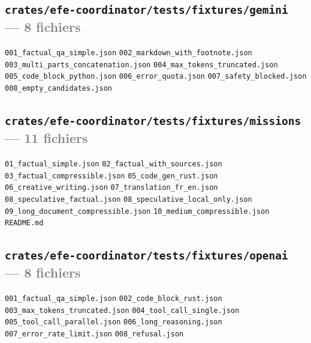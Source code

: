 \documentclass[10pt]{report}
\newcommand{\code}[1]{\texttt{\small #1}}
\begin{document}
\subsection*{\code{crates/efe-coordinator/tests/fixtures/gemini} \normalfont\textcolor{grey}{--- 8 fichiers}}
\begin{sloppypar}\footnotesize\raggedright
\code{001\_factual\_qa\_simple.json} \;\textbullet\; \code{002\_markdown\_with\_footnote.json} \;\textbullet\; \code{003\_multi\_parts\_concatenation.json} \;\textbullet\; \code{004\_max\_tokens\_truncated.json} \;\textbullet\; \code{005\_code\_block\_python.json} \;\textbullet\; \code{006\_error\_quota.json} \;\textbullet\; \code{007\_safety\_blocked.json} \;\textbullet\; \code{008\_empty\_candidates.json}
\end{sloppypar}

\subsection*{\code{crates/efe-coordinator/tests/fixtures/missions} \normalfont\textcolor{grey}{--- 11 fichiers}}
\begin{sloppypar}\footnotesize\raggedright
\code{01\_factual\_simple.json} \;\textbullet\; \code{02\_factual\_with\_sources.json} \;\textbullet\; \code{03\_factual\_compressible.json} \;\textbullet\; \code{05\_code\_gen\_rust.json} \;\textbullet\; \code{06\_creative\_writing.json} \;\textbullet\; \code{07\_translation\_fr\_en.json} \;\textbullet\; \code{08\_speculative\_factual.json} \;\textbullet\; \code{08\_speculative\_local\_only.json} \;\textbullet\; \code{09\_long\_document\_compressible.json} \;\textbullet\; \code{10\_medium\_compressible.json} \;\textbullet\; \code{README.md}
\end{sloppypar}

\subsection*{\code{crates/efe-coordinator/tests/fixtures/openai} \normalfont\textcolor{grey}{--- 8 fichiers}}
\begin{sloppypar}\footnotesize\raggedright
\code{001\_factual\_qa\_simple.json} \;\textbullet\; \code{002\_code\_block\_rust.json} \;\textbullet\; \code{003\_max\_tokens\_truncated.json} \;\textbullet\; \code{004\_tool\_call\_single.json} \;\textbullet\; \code{005\_tool\_call\_parallel.json} \;\textbullet\; \code{006\_long\_reasoning.json} \;\textbullet\; \code{007\_error\_rate\_limit.json} \;\textbullet\; \code{008\_refusal.json}
\end{sloppypar}
\end{document}

